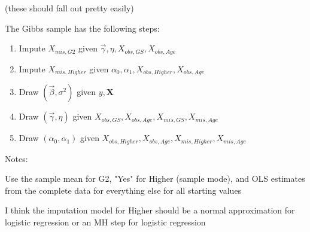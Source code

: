 \documentclass[11pt]{article}
\begin{document}
(these should fall out pretty easily)

The Gibbs sample has the following steps:

\begin{enumerate}
  \item Impute $X_{mis, G2}$ given $\vec\gamma, \eta, X_{obs, GS}, X_{obs, Age}$
  \item Impute $X_{mis, Higher}$ given $\alpha_0, \alpha_1, X_{obs, Higher}, X_{obs, Age}$
  \item Draw $(\vec\beta, \sigma^2)$ given $y, \mathbf{X}$
  \item Draw $(\vec{\gamma}, \eta)$ given $X_{obs, GS}, X_{obs, Age}, X_{mis, GS}, X_{mis, Age}$
  \item Draw $(\alpha_0, \alpha_1)$ given $X_{obs, Higher}, X_{obs, Age}, X_{mis, Higher}, X_{mis, Age}$  
\end{enumerate}

Notes:

Use the sample mean for G2, "Yes" for Higher (sample mode), and OLS estimates from the complete data for everything else for all starting values

I think the imputation model for Higher should be a normal approximation for logistic regression or an MH step for logistic regression

\newpage



\end{document}
